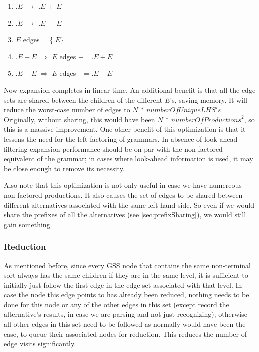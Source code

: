 \documentclass[a4paper,10pt]{article}
\begin{document}
\begin{enumerate}
 \setlength{\itemsep}{0pt}
 \setlength{\parskip}{0pt}
 \setlength{\parsep}{0pt}
 
 \item $.E$ $\rightarrow$ $.E\,+\,E$
 \item $.E$ $\rightarrow$ $.E\,-\,E$
 \item $E$ edges = \{$.E$\}
 \item $.E+E$ $\Rightarrow$ $E$ edges += $.E+E$
 \item $.E-E$ $\Rightarrow$ $E$ edges += $.E-E$
\end{enumerate}
Now expansion completes in linear time. An additional benefit is that all the edge sets are shared between the children of the different $E$'s, saving memory. It will reduce the worst-case number of edges to $N\,*\,\mathit{numberOfUniqueLHS's}$. Originally, without sharing, this would have been $N\,*\,\mathit{numberOfProductions}^2$, so this is a massive improvement. One other benefit of this optimization is that it lessens the need for the left-factoring of grammars. In absence of look-ahead filtering expansion performance should be on par with the non-factored equivalent of the grammar; in cases where look-ahead information is used, it may be close enough to remove its necessity.

Also note that this optimization is not only useful in case we have numereous non-factored productions. It also causes the set of edges to be shared between different alternatives associated with the same left-hand-side. So even if we would share the prefixes of all the alternatives (see \ref{sec:prefixSharing}), we would still gain something.

\subsubsection{Reduction}
\label{subsec:edgeVisitOptimization}
As mentioned before, since every GSS node that contains the same non-terminal sort always has the same children if they are in the same level, it is sufficient to initially just follow the first edge in the edge set associated with that level. In case the node this edge points to has already been reduced, nothing needs to be done for this node or any of the other edges in this set (except record the alternative's results, in case we are parsing and not just recognizing); otherwise all other edges in this set need to be followed as normally would have been the case, to queue their associated nodes for reduction. This reduces the number of edge visits significantly.
\end{document}
